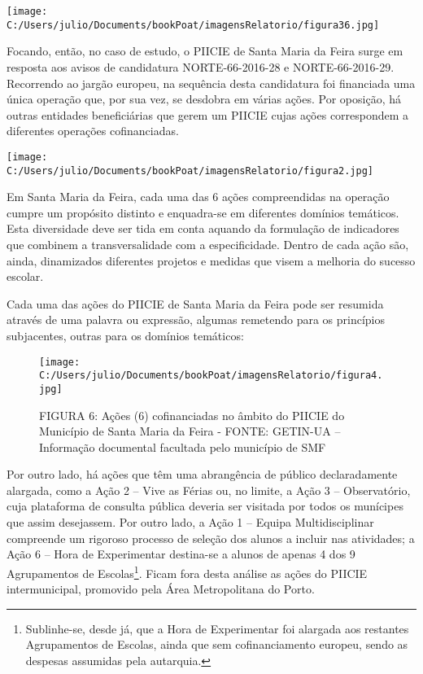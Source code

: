\documentclass[
]{book}
\begin{document}
\texttt{[image: C:/Users/julio/Documents/bookPoat/imagensRelatorio/figura36.jpg]}

Focando, então, no caso de estudo, o PIICIE de Santa Maria da Feira surge em resposta aos avisos de candidatura NORTE-66-2016-28 e NORTE-66-2016-29. Recorrendo ao jargão europeu, na sequência desta candidatura foi financiada uma única operação que, por sua vez, se desdobra em várias ações. Por oposição, há outras entidades beneficiárias que gerem um PIICIE cujas ações correspondem a diferentes operações cofinanciadas.

\texttt{[image: C:/Users/julio/Documents/bookPoat/imagensRelatorio/figura2.jpg]}

Em Santa Maria da Feira, cada uma das 6 ações compreendidas na operação cumpre um propósito distinto e enquadra-se em diferentes domínios temáticos. Esta diversidade deve ser tida em conta aquando da formulação de indicadores que combinem a transversalidade com a especificidade. Dentro de cada ação são, ainda, dinamizados diferentes projetos e medidas que visem a melhoria do sucesso escolar.

Cada uma das ações do PIICIE de Santa Maria da Feira pode ser resumida através de uma palavra ou expressão, algumas remetendo para os princípios subjacentes, outras para os domínios temáticos:

\begin{figure}
\centering
\texttt{[image: C:/Users/julio/Documents/bookPoat/imagensRelatorio/figura4.jpg]}
\caption{FIGURA 6: Ações (6) cofinanciadas no âmbito do PIICIE do Município de Santa Maria da Feira - FONTE: GETIN-UA -- Informação documental facultada pelo município de SMF}
\end{figure}

Por outro lado, há ações que têm uma abrangência de público declaradamente alargada, como a Ação 2 -- Vive as Férias ou, no limite, a Ação 3 -- Observatório, cuja plataforma de consulta pública deveria ser visitada por todos os munícipes que assim desejassem. Por outro lado, a Ação 1 -- Equipa Multidisciplinar compreende um rigoroso processo de seleção dos alunos a incluir nas atividades; a Ação 6 -- Hora de Experimentar destina-se a alunos de apenas 4 dos 9 Agrupamentos de Escolas\footnote{Sublinhe-se, desde já, que a Hora de Experimentar foi alargada aos restantes Agrupamentos de Escolas, ainda que sem cofinanciamento europeu, sendo as despesas assumidas pela autarquia.}. Ficam fora desta análise as ações do PIICIE intermunicipal, promovido pela Área Metropolitana do Porto.
\end{document}
